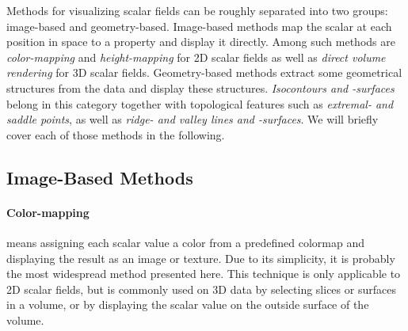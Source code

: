 %
%
Methods for visualizing scalar fields can be roughly separated into two groups:
image-based and geometry-based.
%
Image-based methods map the scalar at each position in space to a property and
display it directly.
%
Among such methods are \emph{color-mapping} and \emph{height-mapping} for
\ac{2D} scalar fields as well as \emph{direct volume rendering} for \ac{3D}
scalar fields.
%
Geometry-based methods extract some geometrical structures from the data and
display these structures.
%
\emph{Isocontours and -surfaces} belong in this category together with
topological features such as \emph{extremal- and saddle points}, as well as
\emph{ridge- and valley lines and -surfaces}.
%
We will briefly cover each of those methods in the following.
%
%

\subsection{Image-Based Methods} %
\label{sub:image_based_methods}
%
\paragraph{Color-mapping} means assigning each scalar value a color from a
predefined colormap and displaying the result as an image or texture.
%
Due to its simplicity, it is probably the most widespread method presented here.
%
This technique is only applicable to \ac{2D} scalar fields, but is commonly used
on \ac{3D} data by selecting slices or surfaces in a volume, or by displaying
the scalar value on the outside surface of the volume.
%

